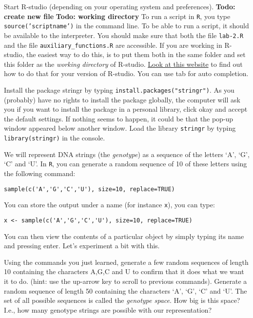 \documentclass[a4paper, 9pt]{article}
\begin{document}
\begin{exercise}
    \action Start R-studio (depending on your operating system and preferences).
     \action\textbf{Todo: create new file}
     \action 
     \textbf{Todo: working directory}
     To run a script in \texttt{R}, you type \texttt{source('scriptname')} in the command line. To be able to run a script, it should be available to the interpreter. You should make sure that both the file \texttt{lab-2.R} and the file \texttt{auxiliary\_functions.R} are accessible. If you are working in R-studio, the easiest way to do this, is to put them both in the same folder and set this folder as the \textit{working directory} of R-studio. \href{https://support.rstudio.com/hc/en-us/articles/200711843-Working-Directories-and-Workspaces}{Look at this website} to find out how to do that for your version of R-studio. You can use tab for auto completion.

    \action Install the package stringr by typing \verb|install.packages("stringr")|. As you (probably) have no rights to install the package globally, the computer will ask you if you want to install the package in a personal library, click okay and accept the default settings. If nothing seems to happen, it could be that the pop-up window appeared below another window.
    \action Load the library \texttt{stringr} by typing \texttt{library(stringr)} in the console.
\end{exercise}


We will represent DNA strings (the \textit{genotype}) as a sequence of
the letters `A', `G', `C' and `U'. In \texttt{R}, you can generate a
random sequence of 10 of these letters using the following command:

\begin{lstlisting}
sample(c('A','G','C','U'), size=10, replace=TRUE)
\end{lstlisting}
You can store the output under a name (for instance \texttt{x}), you can
type:
\begin{lstlisting}
x <- sample(c('A','G','C','U'), size=10, replace=TRUE)
\end{lstlisting}
You can then view the contents of a particular object by simply typing
its name and pressing enter. Let's experiment a bit with this.

\begin{exercise}
    \action Using the commands you just learned, generate a few random sequences of length 10 containing the characters A,G,C and U to confirm that it does what we want it to do. (hint: use the up-arrow key to scroll to previous commands).
    \action Generate a random sequence of length 50 containing the characters `A', `G', `C' and `U'. 
    \askstar The set of all possible sequences is called the \textit{genotype space}. How big is this space? I.e., how many genotype strings are possible with our representation?
\end{exercise}
\end{document}
